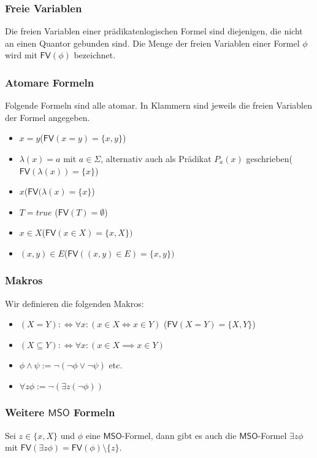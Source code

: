 \documentclass[12pt, german]{article}
\newcommand{\fv}{\mathsf{FV}}
\newcommand{\mso}{\mathsf{MSO}}
\begin{document}
\subsubsection{Freie Variablen}
	Die freien Variablen einer prädikatenlogischen Formel sind diejenigen, die nicht an einen Quantor gebunden sind. 
	Die Menge der freien Variablen einer Formel $\phi$ wird mit $\mathsf{FV}(\phi)$ bezeichnet.

\subsubsection{Atomare Formeln}
	Folgende Formeln sind alle atomar. In Klammern sind jeweils die freien Variablen der Formel angegeben.
	\begin{itemize}
		\item $x=y$\quad ($\mathsf{FV}(x=y)=\{x,y\}$)
		\item $\lambda(x) = a$ mit $a \in \Sigma$, alternativ auch als Prädikat $P_a(x)$ geschrieben\quad ($\fv(\lambda(x))=\{x\}$)
		\item $x$\quad ($\fv(\lambda(x)=\{x\}$)
		\item $T= true$ \quad ($\fv(T)=\emptyset$)
		\item $x \in X$\quad ($\fv(x \in  X)=\{x,X\})$
		\item $(x,y) \in E$\quad ($\fv((x,y) \in  E)=\{x,y\})$
	\end{itemize}
	

	
\subsubsection{Makros}
Wir definieren die folgenden Makros:
\begin{itemize}
	\item $(X = Y) :\iff \forall x :( x \in X \iff x \in Y)$ \quad ($\fv{(X = Y ) = \{X,Y\}}$)
	\item $(X \subseteq Y) :\iff \forall x : (x \in X \implies x \in Y)$
	\item $\phi \land \psi := \neg (\neg \phi \lor \neg \psi)$ etc. 
	\item $\forall z \phi := \neg (\exists z (\neg\phi))$
\end{itemize}

\subsubsection{Weitere $\mso$ Formeln}
	Sei $z \in \{x, X\}$ und $\phi$ eine $\mso$-Formel, dann gibt es auch die $\mso$-Formel $\exists z\phi$ mit $\fv(\exists z \phi) = \fv(\phi) \setminus \{z\}$.\\
	
\end{document}
